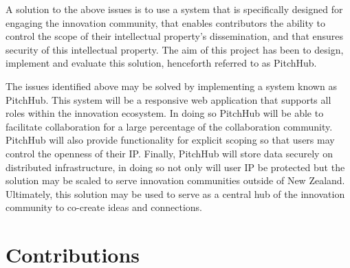 A solution to the above issues is to use a system that is specifically designed for engaging the innovation community, that enables contributors the ability to control the scope of their intellectual property's dissemination, and that ensures security of this intellectual property.
The aim of this project has been to design, implement and evaluate this solution, henceforth referred to as PitchHub.

The issues identified above may be solved by implementing a system known as PitchHub. This system will be a responsive web application that supports all roles within the innovation ecosystem. In doing so PitchHub will be able to facilitate collaboration for a large percentage of the collaboration community. PitchHub will also provide functionality for explicit scoping so that users may control the openness of their IP. Finally, PitchHub will store data securely on distributed infrastructure, in doing so not only will user IP be protected but the solution may be scaled to serve innovation communities outside of New Zealand. Ultimately, this solution may be used to serve as a central hub of the innovation community to co-create ideas and connections.

\section{Contributions}


